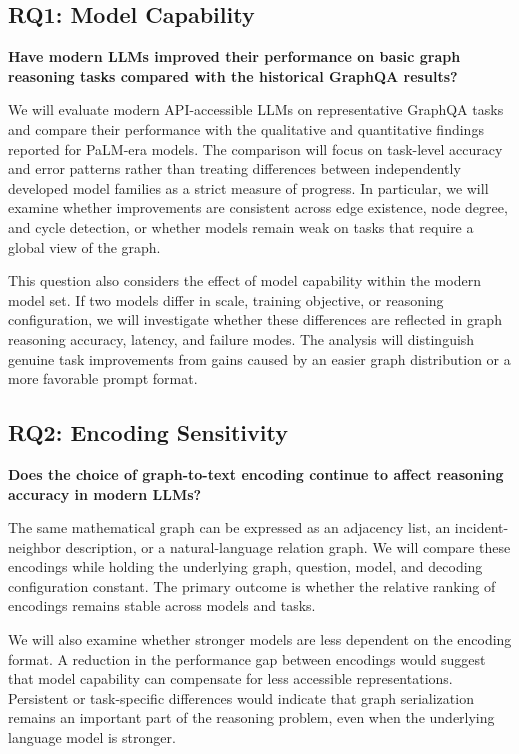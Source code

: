 \documentclass[11pt,a4paper]{article}
\begin{document}
\subsection{RQ1: Model Capability}

\textbf{Have modern LLMs improved their performance on basic graph reasoning tasks compared with the historical GraphQA results?}

We will evaluate modern API-accessible LLMs on representative GraphQA tasks and compare their performance with the qualitative and quantitative findings reported for PaLM-era models. The comparison will focus on task-level accuracy and error patterns rather than treating differences between independently developed model families as a strict measure of progress. In particular, we will examine whether improvements are consistent across edge existence, node degree, and cycle detection, or whether models remain weak on tasks that require a global view of the graph.

This question also considers the effect of model capability within the modern model set. If two models differ in scale, training objective, or reasoning configuration, we will investigate whether these differences are reflected in graph reasoning accuracy, latency, and failure modes. The analysis will distinguish genuine task improvements from gains caused by an easier graph distribution or a more favorable prompt format.

\subsection{RQ2: Encoding Sensitivity}

\textbf{Does the choice of graph-to-text encoding continue to affect reasoning accuracy in modern LLMs?}

The same mathematical graph can be expressed as an adjacency list, an incident-neighbor description, or a natural-language relation graph. We will compare these encodings while holding the underlying graph, question, model, and decoding configuration constant. The primary outcome is whether the relative ranking of encodings remains stable across models and tasks.

We will also examine whether stronger models are less dependent on the encoding format. A reduction in the performance gap between encodings would suggest that model capability can compensate for less accessible representations. Persistent or task-specific differences would indicate that graph serialization remains an important part of the reasoning problem, even when the underlying language model is stronger.
\end{document}
